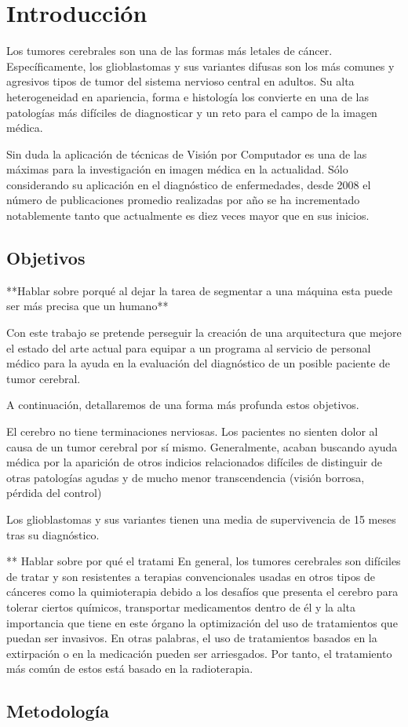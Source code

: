 \chapter{Introducción}

Los tumores cerebrales son una de las formas más letales de cáncer. Específicamente, los glioblastomas y sus variantes difusas son los más comunes y agresivos tipos de tumor del sistema nervioso central en adultos. Su alta heterogeneidad en apariencia, forma e histología los convierte en una de las patologías más difíciles de diagnosticar y un reto para el campo de la imagen médica.

Sin duda la aplicación de técnicas de Visión por Computador es una de las máximas para la investigación en imagen médica en la actualidad. Sólo considerando su aplicación en el diagnóstico de enfermedades, desde 2008 el número de publicaciones promedio realizadas por año se ha incrementado notablemente tanto que actualmente es diez veces mayor que en sus inicios.


\section{Objetivos}

**Hablar sobre porqué al dejar la tarea de segmentar a una máquina esta puede ser más precisa que un humano**

Con este trabajo se pretende perseguir la creación de una arquitectura que mejore el estado del arte actual para equipar a un programa al servicio de personal médico para la ayuda en la evaluación del diagnóstico de un posible paciente de tumor cerebral.

A continuación, detallaremos de una forma más profunda estos objetivos.

El cerebro no tiene terminaciones nerviosas. Los pacientes no sienten dolor al causa de un tumor cerebral por sí mismo. Generalmente, acaban buscando ayuda médica por la aparición de otros indicios relacionados difíciles de distinguir de otras patologías agudas y de mucho menor transcendencia (visión borrosa, pérdida del control)

Los glioblastomas y sus variantes tienen una media de supervivencia de 15 meses tras su diagnóstico.

** Hablar sobre por qué el tratami
En general, los tumores cerebrales son difíciles de tratar y son resistentes a terapias convencionales usadas en otros tipos de cánceres como la quimioterapia debido a los desafíos que presenta el cerebro para tolerar ciertos químicos, transportar medicamentos dentro de él y la alta importancia que tiene en este órgano la optimización del uso de tratamientos que puedan ser invasivos. En otras palabras, el uso de tratamientos basados en la extirpación o en la medicación pueden ser arriesgados. Por tanto, el tratamiento más común de estos está basado en la radioterapia.


\section{Metodología}
